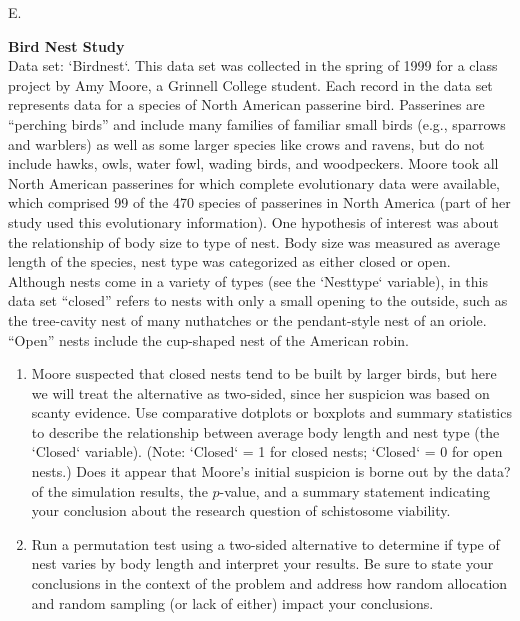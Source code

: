\documentclass[
]{report}
\newcounter{excount}
\renewcommand{\theexcount}{E\arabic{excount}}
\begin{document}
\begin{list}{\theexcount.}{ \setlength{\itemsep}{0.5em}}
  \item \textbf{Bird Nest Study} \\
  Data set: `Birdnest`. This data set was collected in the spring of 1999 for a class project by Amy Moore, a Grinnell College student. Each record in the data set represents data for a species of North American passerine bird. Passerines are “perching birds” and include many families of familiar small birds (e.g., sparrows
and warblers) as well as some larger species like crows and ravens, but do not include hawks, owls, water fowl, wading birds, and woodpeckers. Moore took all North American passerines for which complete evolutionary data were available, which comprised 99 of the 470 species of passerines in North America (part of her study used this evolutionary information). One hypothesis of interest was about the relationship of body size to type of nest. Body size was measured as average
length of the species, nest type was categorized as either closed or open. Although nests come in a variety of types (see the `Nesttype` variable), in this data set “closed” refers to nests with only a small opening to the outside, such as the tree-cavity nest of many nuthatches or the pendant-style
nest of an oriole. “Open” nests include the cup-shaped nest of the American robin.
  \begin{enumerate}
    \setcounter{enumi}{0}  
    \item Moore suspected that closed nests tend to be built by larger birds, but here we will treat the alternative as two-sided, since her suspicion was based on scanty evidence. Use comparative dotplots or boxplots and summary statistics to describe the relationship between average body length and nest type (the `Closed` variable). (Note: `Closed` = 1 for closed nests; `Closed` = 0 for open nests.) Does it appear that Moore’s initial suspicion is borne out by the data?
of the simulation results, the $p$-value, and a summary statement indicating your conclusion about the research question of schistosome viability.
    \item Run a permutation test using a two-sided alternative to determine if type of nest varies by body length and interpret your results. Be sure to state your conclusions in the context of the problem and address how random allocation and random sampling (or lack of either) impact your conclusions.
  \end{enumerate}
  

\end{list}
\end{document}
